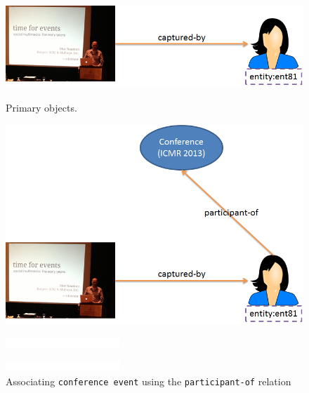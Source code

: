 \begin{figure}[ht!]
\begin{minipage}[b]{0.48\linewidth}
\centering
\includegraphics[width=\textwidth]{media/chapter2/naaman-1.png}
\caption{Primary objects.}
\label{fig:naaman-example-1}
\end{minipage}
\hspace{0.5cm}
\begin{minipage}[b]{0.45\linewidth}
\centering
\includegraphics[width=\textwidth]{media/chapter2/naaman-2.png}
\caption{Associating \texttt{conference event} using the \texttt{participant-of} relation}
\label{fig:naaman-example-2}
\end{minipage}
\begin{minipage}[b]{0.48\linewidth}
\centering
\includegraphics[width=\textwidth]{media/chapter2/white.png}
\label{fig:naaman-example-x}
\end{minipage}
\hspace{0.5cm}
\begin{minipage}[b]{0.45\linewidth}
\centering
\includegraphics[width=\textwidth]{media/chapter2/white.png}

\end{minipage}
\end{figure}

